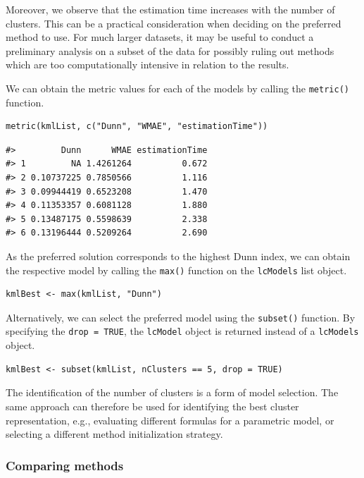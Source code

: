 Moreover, we observe that the estimation time increases with the number of clusters. This can be a practical consideration when deciding on the preferred method to use. For much larger datasets, it may be useful to conduct a preliminary analysis on a subset of the data for possibly ruling out methods which are too computationally intensive in relation to the results.

We can obtain the metric values for each of the models by calling the \texttt{metric()} function.

\begin{verbatim}
metric(kmlList, c("Dunn", "WMAE", "estimationTime"))
\end{verbatim}

\begin{verbatim}
#>         Dunn      WMAE estimationTime
#> 1         NA 1.4261264          0.672
#> 2 0.10737225 0.7850566          1.116
#> 3 0.09944419 0.6523208          1.470
#> 4 0.11353357 0.6081128          1.880
#> 5 0.13487175 0.5598639          2.338
#> 6 0.13196444 0.5209264          2.690
\end{verbatim}

As the preferred solution corresponds to the highest Dunn index, we can obtain the respective model by calling the \texttt{max()} function on the \texttt{lcModels} list object.

\begin{verbatim}
kmlBest <- max(kmlList, "Dunn")
\end{verbatim}

Alternatively, we can select the preferred model using the \texttt{subset()} function. By specifying the \texttt{drop\ =\ TRUE}, the \texttt{lcModel} object is returned instead of a \texttt{lcModels} object.

\begin{verbatim}
kmlBest <- subset(kmlList, nClusters == 5, drop = TRUE)
\end{verbatim}

The identification of the number of clusters is a form of model selection. The same approach can therefore be used for identifying the best cluster representation, e.g., evaluating different formulas for a parametric model, or selecting a different method initialization strategy.

\subsubsection{Comparing methods}\label{comparing-methods}

